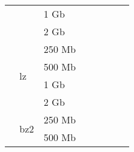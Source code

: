 \documentclass{article}           %
\begin{document}
\begin{table}[]
\begin{tabular}{lllccccc}
\multicolumn{1}{|l|}{}                               & \multicolumn{1}{l|}{}                     & \multicolumn{1}{l|}{1 Gb}   & \multicolumn{1}{c|}{}       & \multicolumn{1}{c|}{}       & \multicolumn{1}{c|}{}           & \multicolumn{1}{c|}{}      & \multicolumn{1}{c|}{}        \\ \cline{3-8} 
\multicolumn{1}{|l|}{}                               & \multicolumn{1}{l|}{}                     & \multicolumn{1}{l|}{2 Gb}   & \multicolumn{1}{c|}{}       & \multicolumn{1}{c|}{}       & \multicolumn{1}{c|}{}           & \multicolumn{1}{c|}{}      & \multicolumn{1}{c|}{}        \\ \cline{2-8} 
\multicolumn{1}{|l|}{}                               & \multicolumn{1}{l|}{\multirow{4}{*}{lz}}  & \multicolumn{1}{l|}{250 Mb} & \multicolumn{1}{c|}{}       & \multicolumn{1}{c|}{}       & \multicolumn{1}{c|}{}           & \multicolumn{1}{c|}{}      & \multicolumn{1}{c|}{}        \\ \cline{3-8} 
\multicolumn{1}{|l|}{}                               & \multicolumn{1}{l|}{}                     & \multicolumn{1}{l|}{500 Mb} & \multicolumn{1}{c|}{}       & \multicolumn{1}{c|}{}       & \multicolumn{1}{c|}{}           & \multicolumn{1}{c|}{}      & \multicolumn{1}{c|}{}        \\ \cline{3-8} 
\multicolumn{1}{|l|}{}                               & \multicolumn{1}{l|}{}                     & \multicolumn{1}{l|}{1 Gb}   & \multicolumn{1}{c|}{}       & \multicolumn{1}{c|}{}       & \multicolumn{1}{c|}{}           & \multicolumn{1}{c|}{}      & \multicolumn{1}{c|}{}        \\ \cline{3-8} 
\multicolumn{1}{|l|}{}                               & \multicolumn{1}{l|}{}                     & \multicolumn{1}{l|}{2 Gb}   & \multicolumn{1}{c|}{}       & \multicolumn{1}{c|}{}       & \multicolumn{1}{c|}{}           & \multicolumn{1}{c|}{}      & \multicolumn{1}{c|}{}        \\ \cline{2-8} 
\multicolumn{1}{|l|}{}                               & \multicolumn{1}{l|}{\multirow{4}{*}{bz2}} & \multicolumn{1}{l|}{250 Mb} & \multicolumn{1}{c|}{}       & \multicolumn{1}{c|}{}       & \multicolumn{1}{c|}{}           & \multicolumn{1}{c|}{}      & \multicolumn{1}{c|}{}        \\ \cline{3-8} 
\multicolumn{1}{|l|}{}                               & \multicolumn{1}{l|}{}                     & \multicolumn{1}{l|}{500 Mb} & \multicolumn{1}{c|}{}       & \multicolumn{1}{c|}{}       & \multicolumn{1}{c|}{}           & \multicolumn{1}{c|}{}      & \multicolumn{1}{c|}{}        \\ \cline{3-8} 

\end{tabular}
\end{table}
\end{document}
